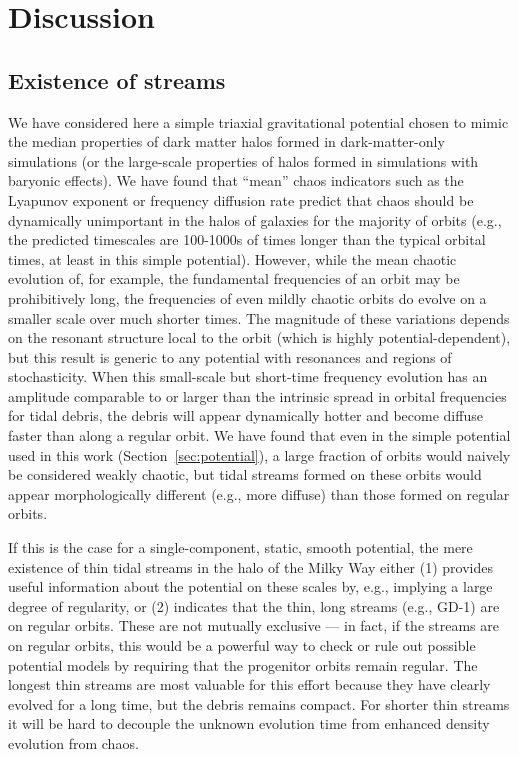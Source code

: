 \documentclass[letterpaper,12pt,preprint]{aastex}
\begin{document}
\section{Discussion}\label{sec:discussion}

\subsection{Existence of streams}

We have considered here a simple triaxial gravitational potential chosen to mimic the median properties of dark matter halos formed in dark-matter-only simulations (or the large-scale properties of halos formed in simulations with baryonic effects). We have found that ``mean'' chaos indicators such as the Lyapunov exponent or frequency diffusion rate predict that chaos should be dynamically unimportant in the halos of galaxies for the majority of orbits (e.g., the predicted timescales are 100-1000s of times longer than the typical orbital times, at least in this simple potential). However, while the mean chaotic evolution of, for example, the fundamental frequencies of an orbit may be prohibitively long, the frequencies of even mildly chaotic orbits do evolve on a smaller scale over much shorter times. The magnitude of these variations depends on the resonant structure local to the orbit (which is highly potential-dependent), but this result is generic to any potential with resonances and regions of stochasticity. When this small-scale but short-time frequency evolution has an amplitude comparable to or larger than the intrinsic spread in orbital frequencies for tidal debris, the debris will appear dynamically hotter and become diffuse faster than along a regular orbit. We have found that even in the simple potential used in this work (Section~\ref{sec:potential}), a large fraction of orbits would naively be considered weakly chaotic, but tidal streams formed on these orbits would appear morphologically different (e.g., more diffuse) than those formed on regular orbits. 

If this is the case for a single-component, static, smooth potential, the mere existence of thin tidal streams in the halo of the Milky Way either (1) provides useful information about the potential on these scales by, e.g., implying a large degree of regularity, or (2) indicates that the thin, long streams (e.g., GD-1) are on regular orbits. These are not mutually exclusive --- in fact, if the streams are on regular orbits, this would be a powerful way to check or rule out possible potential models by requiring that the progenitor orbits remain regular. The longest thin streams are most valuable for this effort because they have clearly evolved for a long time, but the debris remains compact. For shorter thin streams it will be hard to decouple the unknown evolution time from enhanced density evolution from chaos.
\end{document}
